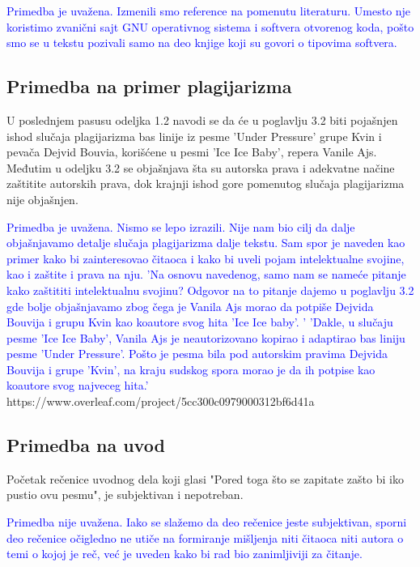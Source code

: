 \documentclass[a4paper]{report}
\newcommand{\odgovor}[1]{\textcolor{blue}{#1}}
\begin{document}
\odgovor{
	Primedba je uvažena. Izmenili smo reference na pomenutu literaturu. Umesto nje koristimo
	zvanični sajt GNU operativnog sistema i softvera otvorenog koda, pošto smo se u tekstu pozivali samo
	na deo knjige koji su govori o tipovima softvera.
}

\subsection{Primedba na primer plagijarizma}
\label{primedba:Primer plagijarizma}
U poslednjem pasusu odeljka 1.2 navodi se da će u poglavlju 3.2 biti pojašnjen ishod slučaja plagijarizma bas linije iz pesme 'Under Pressure' 
grupe Kvin i pevača Dejvid Bouvia, korišćene u pesmi 'Ice Ice Baby', repera Vanile Ajs. Međutim u odeljku 3.2 se objašnjava šta su autorska prava
i adekvatne načine zaštitite autorskih prava, dok krajnji ishod gore pomenutog slučaja plagijarizma nije objašnjen. 
\newpage

\odgovor{
	Primedba je uvažena. Nismo se lepo izrazili. Nije nam bio cilj da dalje objašnjavamo detalje slučaja plagijarizma dalje tekstu.
	Sam spor je naveden kao primer kako bi zainteresovao čitaoca i kako bi uveli pojam intelektualne svojine, kao i zaštite i prava na nju.\newline
	'Na osnovu navedenog, samo nam se nameće pitanje kako zaštititi intelektualnu svojinu? Odgovor na to pitanje
	 dajemo u poglavlju 3.2 gde bolje objašnjavamo zbog čega je Vanila Ajs morao da potpiše Dejvida Bouvija i grupu
	 Kvin kao koautore svog hita 'Ice Ice baby'. '
	'Dakle, u slučaju pesme 'Ice Ice Baby', Vanila Ajs je neautorizovano kopirao i adaptirao 
     bas liniju pesme 'Under Pressure'. Pošto je pesma bila pod autorskim pravima Dejvida Bouvija i
	 grupe 'Kvin', na kraju sudskog spora morao je da ih potpise kao koautore svog najveceg hita.'
}https://www.overleaf.com/project/5cc300c0979000312bf6d41a

\subsection{Primedba na uvod}
\label{primedba:Uvod}
Početak rečenice uvodnog dela koji glasi "Pored toga što se zapitate zašto bi iko pustio ovu pesmu", je subjektivan i nepotreban.

\odgovor{
	Primedba nije uvažena. Iako se slažemo da deo rečenice jeste subjektivan, sporni deo rečenice očigledno ne utiče na formiranje mišljenja niti čitaoca niti autora o temi o kojoj je reč, već je uveden kako bi rad bio 
	zanimljiviji za čitanje.
}
\end{document}
